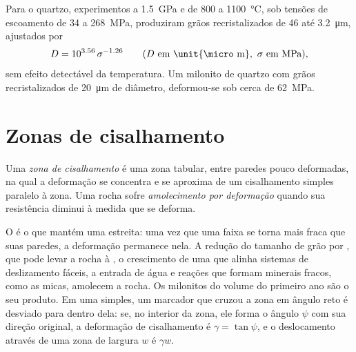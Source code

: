 Para o quartzo, experimentos a \qty{1.5}{GPa} e de 800 a \qty{1100}{\celsius}, sob
tensões de escoamento de 34 a \qty{268}{MPa}, produziram grãos recristalizados de 46 até
\qty{3.2}{\micro m}, ajustados por
\[
  D = 10^{3.56}\,\sigma^{-1.26}\qquad(D\text{ em \unit{\micro m}},\ \sigma\text{ em MPa}),
\]
sem efeito detectável da temperatura. Um milonito de quartzo com
grãos recristalizados de \qty{20}{\micro m} de diâmetro, deformou-se sob cerca de
\qty{62}{MPa}.

\section{Zonas de cisalhamento}

\begin{definition}\label{def:b3:deformation-mechanisms:shear-zone}
Uma \emph{zona de cisalhamento} é uma zona tabular, entre paredes
pouco deformadas, na qual a deformação se concentra e se aproxima de um
cisalhamento simples paralelo à zona. Uma rocha sofre \emph{amolecimento por
deformação} quando sua resistência diminui à medida que se deforma.
\end{definition}

O  é o que mantém uma  estreita: uma vez que uma faixa
se torna mais fraca que suas paredes, a deformação permanece nela. A redução do tamanho de grão por
, que pode levar a rocha à , o crescimento de uma
 que alinha sistemas de deslizamento fáceis, a entrada de água e reações que formam
minerais fracos, como as micas, amolecem a rocha. Os milonitos do volume do primeiro ano
são o seu produto. Em uma  simples, um marcador que
cruzou a zona em ângulo reto é desviado para dentro dela: se, no interior da zona, ele
forma o ângulo $\psi$ com sua direção original, a deformação de cisalhamento é $\gamma
= \tan\psi$, e o deslocamento através de uma zona de largura $w$ é $\gamma w$.

